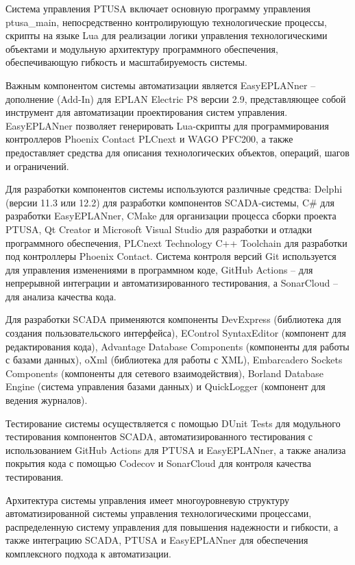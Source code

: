 {	\par \redline Система управления PTUSA включает основную программу управления ptusa\_main, непосредственно контролирующую технологические процессы, скрипты на языке Lua для реализации логики управления технологическими объектами и модульную архитектуру программного обеспечения, обеспечивающую гибкость и масштабируемость системы.
	
	\par \redline Важным компонентом системы автоматизации является EasyEPLANner – дополнение (Add-In) для EPLAN Electric P8 версии 2.9, представляющее собой инструмент для автоматизации проектирования систем управления. EasyEPLANner позволяет генерировать Lua-скрипты для программирования контроллеров Phoenix Contact PLCnext и WAGO PFC200, а также предоставляет средства для описания технологических объектов, операций, шагов и ограничений.
	
	\par \redline Для разработки компонентов системы используются различные средства: Delphi (версии 11.3 или 12.2) для разработки компонентов SCADA-системы, C\# для разработки EasyEPLANner, CMake для организации процесса сборки проекта PTUSA, Qt Creator и Microsoft Visual Studio для разработки и отладки программного обеспечения, PLCnext Technology C++ Toolchain для разработки под контроллеры Phoenix Contact. Система контроля версий Git используется для управления изменениями в программном коде, GitHub Actions – для непрерывной интеграции и автоматизированного тестирования, а SonarCloud – для анализа качества кода.
	
	\par \redline Для разработки SCADA применяются компоненты DevExpress (библиотека для создания пользовательского интерфейса), EControl SyntaxEditor (компонент для редактирования кода), Advantage Database Components (компоненты для работы с базами данных), oXml (библиотека для работы с XML), Embarcadero Sockets Components (компоненты для сетевого взаимодействия), Borland Database Engine (система управления базами данных) и QuickLogger (компонент для ведения журналов).
	
	\par \redline Тестирование системы осуществляется с помощью DUnit Tests для модульного тестирования компонентов SCADA, автоматизированного тестирования с использованием GitHub Actions для PTUSA и EasyEPLANner, а также анализа покрытия кода с помощью Codecov и SonarCloud для контроля качества тестирования.
	
	\par \redline Архитектура системы управления имеет многоуровневую структуру автоматизированной системы управления технологическими процессами, распределенную систему управления для повышения надежности и гибкости, а также интеграцию SCADA, PTUSA и EasyEPLANner для обеспечения комплексного подхода к автоматизации.
	
}
